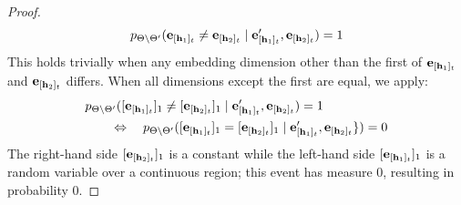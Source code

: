 \begin{proof}
\begin{align}
        p_{\Theta\setminus\Theta'}(\mathbf{e}_{[\mathbf{h}_1]_t}\neq\mathbf{e}_{[\mathbf{h}_2]_t}\mid \mathbf{e}_{[\mathbf{h}_1]_t}',\mathbf{e}_{[\mathbf{h}_2]_t})=1
    \end{align}
    This holds trivially when any embedding dimension other than the first of $\mathbf{e}_{[\mathbf{h}_1]_{t}}$ and $\mathbf{e}_{[\mathbf{h}_2]_{t}}$ differs. When all dimensions except the first are equal, we apply:
    \begin{align}
       &p_{\Theta\setminus\Theta'}([\mathbf{e}_{[\mathbf{h}_1]_{t}}]_{1}\neq[\mathbf{e}_{[\mathbf{h}_2]_{t}}]_{1}\mid \mathbf{e}_{[\mathbf{h}_1]_t}',\mathbf{e}_{[\mathbf{h}_2]_t})=1  \\
       &\qquad \Leftrightarrow \quad p_{\Theta\setminus\Theta'}([\mathbf{e}_{[\mathbf{h}_1]_{t}}]_{1}=[\mathbf{e}_{[\mathbf{h}_2]_{t}}]_{1}\mid \mathbf{e}_{[\mathbf{h}_1]_t}',\mathbf{e}_{[\mathbf{h}_2]_t}\})=0 \nonumber
    \end{align}
    The right-hand side $[\mathbf{e}_{[\mathbf{h}_2]_{t}}]_{1}$ is a constant while the left-hand side $[\mathbf{e}_{[\mathbf{h}_1]_{t}}]_{1}$ is a random variable over a continuous region; this event has measure 0, resulting in probability 0.  
\end{proof}

\newcommand{\MLP}{\mathbf{m}}
